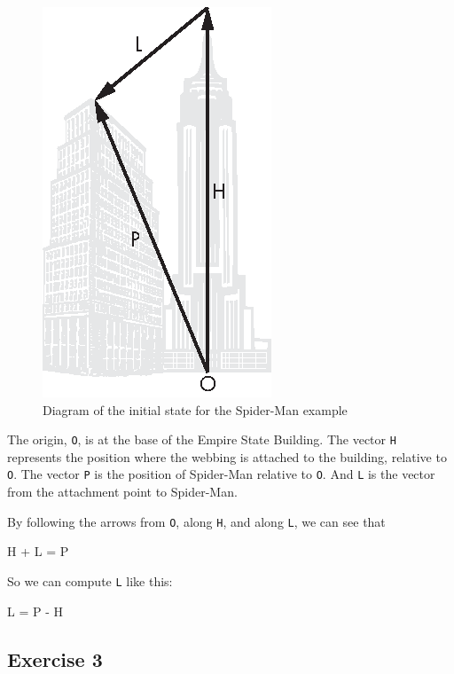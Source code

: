 \begin{figure}[h]
\centerline{\includegraphics[scale=0.8]{images/figure14_01_new.eps}}
\caption{Diagram of the initial state for the Spider-Man example}
\label{spiderman}
\end{figure}

The origin, \lstinline{O}, is at the base of the Empire State Building. The
vector \lstinline{H} represents the position where the webbing is attached
to the building, relative to \lstinline{O}. The vector \lstinline{P} is the
position of Spider-Man relative to \lstinline{O}. And \lstinline{L} is the
vector from the attachment point to Spider-Man.


By following the arrows from \lstinline{O}, along \lstinline{H}, and along
\lstinline{L}, we can see that

\begin{code}
H + L = P
\end{code}

So we can compute \lstinline{L} like this:

\begin{code}
L = P - H
\end{code}

\subsection{Exercise 3}

